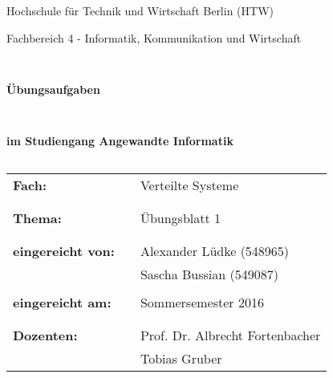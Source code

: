 \documentclass[a4paper]{scrartcl}
\begin{document}
\thispagestyle{empty}

%
%

\thispagestyle{empty}
\begin{center}
\Large{Hochschule für Technik und Wirtschaft Berlin (HTW)}\\
\end{center}


\begin{center}
\Large{Fachbereich 4 - Informatik, Kommunikation und Wirtschaft}
\end{center}
\begin{verbatim}


\end{verbatim}
\begin{center}
\textbf{\LARGE{Übungsaufgaben}}
\end{center}
\begin{verbatim}


\end{verbatim}
\begin{center}
\textbf{im Studiengang Angewandte Informatik}
\end{center}
\begin{verbatim}
\end{verbatim}

\begin{flushleft}
\begin{tabular}{lll}
\textbf{Fach:} & & Verteilte Systeme\\
& & \\
& & \\
\textbf{Thema:} & & Übungsblatt 1\\
& & \\
& & \\
\textbf{eingereicht von:} & & Alexander Lüdke (548965)\\
& & Sascha Bussian (549087)\\
& & \\
\textbf{eingereicht am:} & & Sommersemester 2016 \\
& & \\
& & \\
\textbf{Dozenten:} & & Prof. Dr. Albrecht Fortenbacher\\
& & Tobias Gruber \\
\end{tabular}
\end{flushleft}
\end{document}
